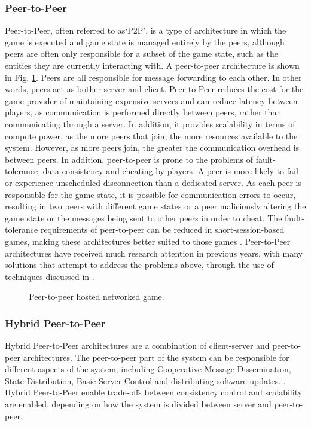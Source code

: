 \subsubsection{Peer-to-Peer}
Peer-to-Peer, often referred to as`P2P', is a type of architecture in which the game is executed and game state is managed entirely by the peers, although peers are often only responsible for a subset of the game state, such as the entities they are currently interacting with. A peer-to-peer architecture is shown in Fig. \ref{fig_P2P}. Peers are all responsible for message forwarding to each other. In other words, peers act as bother server and client. Peer-to-Peer reduces the cost for the game provider of maintaining expensive servers and can reduce latency between players, as communication is performed directly between peers, rather than communicating through a server. In addition, it provides scalability in terms of compute power, as the more peers that join, the more resources available to the system. However, as more peers join, the greater the communication overhead is between peers. In addition, peer-to-peer is prone to the problems of fault-tolerance, data consistency and cheating by players. A peer is more likely to fail or experience unscheduled disconnection than a dedicated server. As each peer is responsible for the game state, it is possible for communication errors to occur, resulting in two peers with different game states or a peer maliciously altering the game state or the messages being sent to other peers in order to cheat. The fault-tolerance requirements of peer-to-peer can be reduced in short-session-based games, making these architectures better suited to those games \cite{P2PSurvey}. Peer-to-Peer architectures have received much research attention in previous years, with many solutions that attempt to address the problems above, through the use of techniques discussed in \cite{P2PSurvey}.


\begin{figure}
	\centering
	
	\caption{Peer-to-peer hosted networked game.}
	\label{fig_P2P}
\end{figure}

\subsubsection{Hybrid Peer-to-Peer}
Hybrid Peer-to-Peer architectures are a combination of client-server and peer-to-peer architectures. The peer-to-peer part of the system can be responsible for different aspects of the system, including Cooperative Message Dissemination, State Distribution, Basic Server Control and distributing software updates. \cite{P2PSurvey}. Hybrid Peer-to-Peer enable trade-offs between consistency control and scalability are enabled, depending on how the system is divided between server and peer-to-peer.

